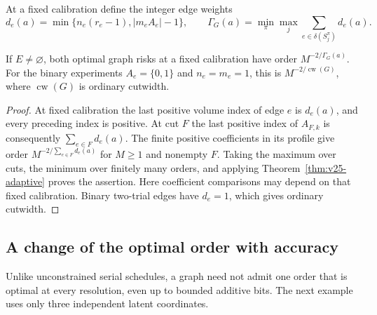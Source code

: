At a fixed calibration define the integer edge weights
\[
 d_e(a)=\min\{n_e(r_e-1),|m_eA_e|-1\},\qquad
 \Gamma_G(a)=\min_\pi\max_j\sum_{e\in\delta(S_j^\pi)}d_e(a).
\]
\begin{corollary}\label{cor:v25-cutwidth}
If $E\ne\varnothing$, both optimal graph risks at a fixed calibration
have order $M^{-2/\Gamma_G(a)}$. For the binary experiments
$A_e=\{0,1\}$ and $n_e=m_e=1$, this is $M^{-2/\operatorname{cw}(G)}$,
where $\operatorname{cw}(G)$ is ordinary cutwidth.
\end{corollary}
\begin{proof}
At fixed calibration the last positive volume index of edge $e$ is
$d_e(a)$, and every preceding index is positive. At cut $F$ the last
positive index of $A_{F,k}$ is consequently $\sum_{e\in F}d_e(a)$.
The finite positive coefficients in its profile give order
$M^{-2/\sum_{e\in F}d_e(a)}$ for $M\ge1$ and nonempty $F$.
Taking the maximum over cuts, the minimum over finitely many orders,
and applying Theorem~\ref{thm:v25-adaptive} proves the assertion.
Here coefficient comparisons may depend on that fixed calibration.
Binary two-trial edges have $d_e=1$, which gives ordinary cutwidth.
\end{proof}

\subsection{A change of the optimal order with accuracy}
Unlike unconstrained serial schedules, a graph need not admit one
order that is optimal at every resolution, even up to bounded additive
bits. The next example uses only three independent latent coordinates.

